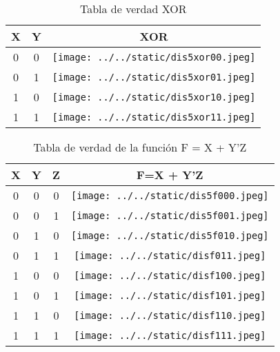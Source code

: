 \documentclass{article}
\begin{document}
\begin{table}[H]
	\centering
	\begin{tabular}{|c|c|c|}
		\hline
		X & Y & XOR \\
		\hline
		0 & 0 & \texttt{[image: ../../static/dis5xor00.jpeg]} \\	
		\hline
		0 & 1 &  \texttt{[image: ../../static/dis5xor01.jpeg]}\\
	\hline
	1 & 0 &  \texttt{[image: ../../static/dis5xor10.jpeg]}\\
	\hline
	1 & 1 &  \texttt{[image: ../../static/dis5xor11.jpeg]}\\
	\hline
\end{tabular}
\caption{Tabla de verdad XOR}
\label{table:9}
\end{table}

\begin{table}[H]
	\centering
\begin{tabular}{|c|c|c|c|}
\hline
X & Y & Z & F=X + Y'Z \\
\hline
0 & 0 & 0 & \texttt{[image: ../../static/dis5f000.jpeg]} \\
0 & 0 & 1 & \texttt{[image: ../../static/dis5f001.jpeg]} \\
0 & 1 & 0 &  \texttt{[image: ../../static/dis5f010.jpeg]}\\
0 & 1 & 1 &  \texttt{[image: ../../static/disf011.jpeg]}\\
1 & 0 & 0 &  \texttt{[image: ../../static/disf100.jpeg]}\\
1 & 0 & 1 &  \texttt{[image: ../../static/disf101.jpeg]}\\
1 & 1 & 0 &  \texttt{[image: ../../static/disf110.jpeg]}\\
1 & 1 & 1 &  \texttt{[image: ../../static/disf111.jpeg]}\\
\hline
\end{tabular}
\caption{Tabla de verdad de la función F = X + Y'Z}
\label{table:10}
\end{table}
\end{document}
